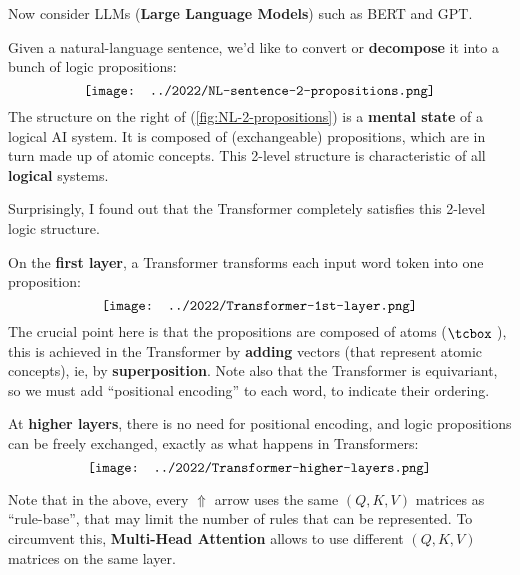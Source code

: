 \begin{preview}
\begin{minipage}{\textwidth}
Now consider LLMs (\textbf{Large Language Models}) such as BERT and GPT.

Given a natural-language sentence, we'd like to convert or \textbf{decompose} it into a bunch of logic propositions:
\begin{equation}
\label{fig:NL-2-propositions}
\vcenter{\hbox{\texttt{[image: ../2022/NL-sentence-2-propositions.png]}}}
\end{equation}
The structure on the right of (\ref{fig:NL-2-propositions}) is a \textbf{mental state} of a logical AI system.  It is composed of (exchangeable) propositions, which are in turn made up of atomic concepts.  This 2-level structure is characteristic of all \textbf{logical} systems.

Surprisingly, I found out that the Transformer completely satisfies this 2-level logic structure.

On the \textbf{first layer}, a Transformer transforms each input word token into one proposition:
\begin{equation}
\vcenter{\hbox{\texttt{[image: ../2022/Transformer-1st-layer.png]}}}
\end{equation}
The crucial point here is that the propositions are composed of atoms ($\atom$), this is achieved in the Transformer by \textbf{adding} vectors (that represent atomic concepts), ie, by \textbf{superposition}.  Note also that the Transformer is equivariant, so we must add ``positional encoding'' to each word, to indicate their ordering.

At \textbf{higher layers}, there is no need for positional encoding, and logic propositions can be freely exchanged, exactly as what happens in Transformers:
\begin{equation}
\vcenter{\hbox{\texttt{[image: ../2022/Transformer-higher-layers.png]}}}
\end{equation}

Note that in the above, every $\Uparrow$ arrow uses the same $(Q,K,V)$ matrices as ``rule-base'', that may limit the number of rules that can be represented.  To circumvent this, \textbf{Multi-Head Attention} allows to use different $(Q,K,V)$ matrices on the same layer.

\end{minipage}
\end{preview}

\begin{comment}
\begin{preview}
\begin{minipage}{\textwidth}
\setlength{\parskip}{0.4\baselineskip}

\begin{textblock*}{20cm}(2.1cm,2cm) %
	{\color{red}{\large \textcircled{\small 2}}}
	\hspace{8cm}
	\color{blue}{\footnotesize \cc{逻辑 Transformer}{Logic Transformer}}
\end{textblock*}
\vspace*{0.3cm} 

\end{minipage}
\end{preview}
\end{comment}


